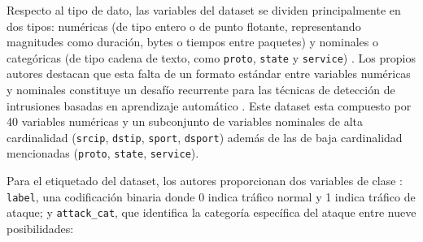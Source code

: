 \documentclass[conference]{IEEEtran}
\begin{document}
Respecto al tipo de dato, las variables del dataset se dividen 
principalmente en dos tipos: numéricas (de tipo entero o de punto 
flotante, representando magnitudes como duración, bytes o tiempos 
entre paquetes) y nominales o categóricas (de tipo cadena de texto, 
como \texttt{proto}, \texttt{state} y \texttt{service}) 
\cite{moustafa2016evaluation}. Los propios autores destacan que esta 
falta de un formato estándar entre variables numéricas y nominales 
constituye un desafío recurrente para las técnicas de detección de 
intrusiones basadas en aprendizaje automático 
\cite{moustafa2016evaluation}. Este dataset esta compuesto por 40 variables
numéricas y un subconjunto de variables nominales de alta 
cardinalidad (\texttt{srcip}, \texttt{dstip}, \texttt{sport}, 
\texttt{dsport}) además de las de baja cardinalidad mencionadas 
(\texttt{proto}, \texttt{state}, \texttt{service}).

Para el etiquetado del dataset, los autores proporcionan dos variables de clase \cite{moustafa2016evaluation}: \texttt{label}, una codificación binaria donde 0 indica tráfico normal y 1 indica  tráfico de ataque; y \texttt{attack\_cat}, que identifica la categoría específica del ataque entre nueve posibilidades:
\end{document}
